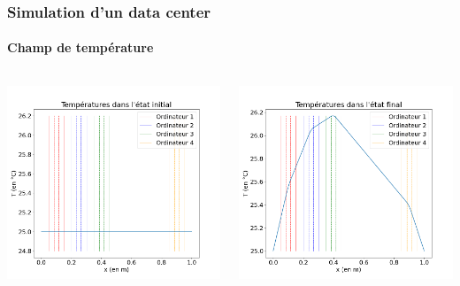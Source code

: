 \documentclass[a4paper,11pt]{beamer}
\begin{document}
\begin{frame}
    \frametitle{Simulation d'un data center}
    \framesubtitle{Champ de température}

    \begin{columns}
        \begin{column}{0.5\textwidth}
            \includegraphics[width=\textwidth]{temperatures_initiales.png}
        \end{column}
        \begin{column}{0.5\textwidth}
            \includegraphics[width=\textwidth]{temperatures_finales.png}
        \end{column}
    \end{columns}
\end{frame}
\end{document}
